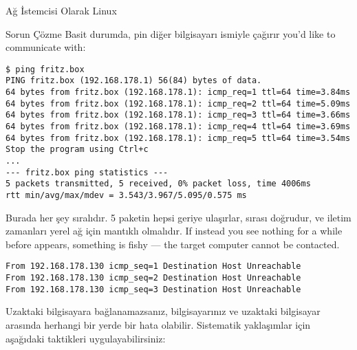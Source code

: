 \begin{section}{Ağ İstemcisi Olarak Linux}
\begin{subsection}{Sorun Çözme}
Basit durumda, pin diğer bilgisayarı ismiyle çağırır you’d like to communicate with:

\begin{verbatim}
$ ping fritz.box
PING fritz.box (192.168.178.1) 56(84) bytes of data.
64 bytes from fritz.box (192.168.178.1): icmp_req=1 ttl=64 time=3.84ms
64 bytes from fritz.box (192.168.178.1): icmp_req=2 ttl=64 time=5.09ms
64 bytes from fritz.box (192.168.178.1): icmp_req=3 ttl=64 time=3.66ms
64 bytes from fritz.box (192.168.178.1): icmp_req=4 ttl=64 time=3.69ms
64 bytes from fritz.box (192.168.178.1): icmp_req=5 ttl=64 time=3.54ms
Stop the program using Ctrl+c
...
--- fritz.box ping statistics ---
5 packets transmitted, 5 received, 0% packet loss, time 4006ms
rtt min/avg/max/mdev = 3.543/3.967/5.095/0.575 ms
\end{verbatim}

Burada her şey sıralıdır. 5 paketin hepsi geriye ulaşırlar, sırası doğrudur, ve iletim zamanları yerel ağ için mantıklı olmalıdır. If instead you see nothing for a while before appears, something is fishy — the target computer cannot be contacted.

\begin{verbatim}
From 192.168.178.130 icmp_seq=1 Destination Host Unreachable
From 192.168.178.130 icmp_seq=2 Destination Host Unreachable
From 192.168.178.130 icmp_seq=3 Destination Host Unreachable
\end{verbatim}

Uzaktaki bilgisayara bağlanamazsanız, bilgisayarınız ve uzaktaki bilgisayar arasında herhangi bir yerde bir hata olabilir. Sistematik yaklaşımlar için aşağıdaki taktikleri uygulayabilirsiniz:


\end{subsection}
\end{section}
